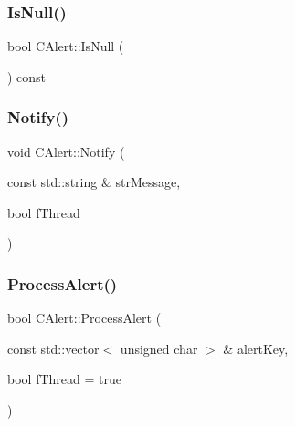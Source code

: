 \mbox{\label{class_c_alert_a9c728b7fe91e74c51116a23b07d6978a}} 
\subsubsection{\texorpdfstring{Is\+Null()}{IsNull()}}
{\footnotesize\ttfamily bool C\+Alert\+::\+Is\+Null (\begin{DoxyParamCaption}{ }\end{DoxyParamCaption}) const}

\mbox{\label{class_c_alert_a3da23857c8ed275621ee032a703c04a1}} 
\subsubsection{\texorpdfstring{Notify()}{Notify()}}
{\footnotesize\ttfamily void C\+Alert\+::\+Notify (\begin{DoxyParamCaption}\item[{const std\+::string \&}]{str\+Message,  }\item[{bool}]{f\+Thread }\end{DoxyParamCaption})\hspace{0.3cm}{\ttfamily [static]}}

\mbox{\label{class_c_alert_af63a26aab450c2bc4781717e30ede67b}} 
\subsubsection{\texorpdfstring{Process\+Alert()}{ProcessAlert()}}
{\footnotesize\ttfamily bool C\+Alert\+::\+Process\+Alert (\begin{DoxyParamCaption}\item[{const std\+::vector$<$ unsigned char $>$ \&}]{alert\+Key,  }\item[{bool}]{f\+Thread = {\ttfamily true} }\end{DoxyParamCaption})}

\mbox{\label{class_c_alert_a21a801f1a5978889722771d4eb13bf37}} 
